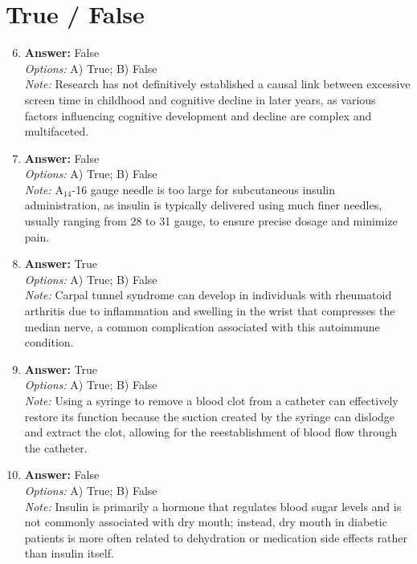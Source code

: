\documentclass[12pt]{article}
\begin{document}
\section*{True / False}
\begin{enumerate}[label=\arabic*.]
\setcounter{enumi}{5}
\item \textbf{Answer:} False
\\ \textit{Options:} A) True; B) False
\\ \textit{Note:} Research has not definitively established a causal link between excessive screen time in childhood and cognitive decline in later years, as various factors influencing cognitive development and decline are complex and multifaceted.
\item \textbf{Answer:} False
\\ \textit{Options:} A) True; B) False
\\ \textit{Note:} A$_{14}$-16 gauge needle is too large for subcutaneous insulin administration, as insulin is typically delivered using much finer needles, usually ranging from 28 to 31 gauge, to ensure precise dosage and minimize pain.
\item \textbf{Answer:} True
\\ \textit{Options:} A) True; B) False
\\ \textit{Note:} Carpal tunnel syndrome can develop in individuals with rheumatoid arthritis due to inflammation and swelling in the wrist that compresses the median nerve, a common complication associated with this autoimmune condition.
\item \textbf{Answer:} True
\\ \textit{Options:} A) True; B) False
\\ \textit{Note:} Using a syringe to remove a blood clot from a catheter can effectively restore its function because the suction created by the syringe can dislodge and extract the clot, allowing for the reestablishment of blood flow through the catheter.
\item \textbf{Answer:} False
\\ \textit{Options:} A) True; B) False
\\ \textit{Note:} Insulin is primarily a hormone that regulates blood sugar levels and is not commonly associated with dry mouth; instead, dry mouth in diabetic patients is more often related to dehydration or medication side effects rather than insulin itself.
\end{enumerate}
\end{document}
